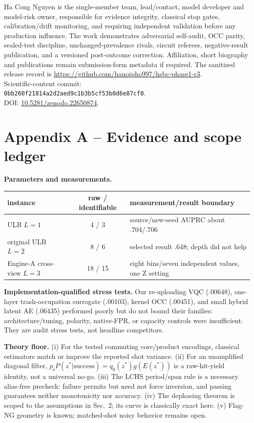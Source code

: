\documentclass[10pt,a4paper]{article}
\newcommand{\psucc}{p_{\mathrm{s}}}
\begin{document}
Ha Cong Nguyen is the single-member team, lead/contact, model developer and
model-risk owner, responsible for evidence integrity, classical stop gates,
calibration/drift monitoring, and requiring independent validation before any
production influence. The work demonstrates adversarial self-audit, OCC
parity, sealed-test discipline, unchanged-prevalence rivals, circuit referees,
negative-result publication, and a versioned post-outcome correction.
Affiliation, short biography and publications remain submission-form metadata
if required. The sanitized release record is
\url{https://github.com/hanoipho997/hsbc-phase1-r3}.\\
Scientific-content commit:\\
\texttt{0bb260f21814a2d2aed9c1b3b5cf53b0d6e87cf0}.\\
DOI: \href{https://doi.org/10.5281/zenodo.22650874}{10.5281/zenodo.22650874}.

\clearpage
\appendix
\section*{Appendix A -- Evidence and scope ledger}

\textbf{Parameters and measurements.}
\begin{center}\small
\begin{tabularx}{\linewidth}{@{}XcX@{}}
\toprule
instance & raw / identifiable & measurement/result boundary\\
\midrule
ULB $L=1$ & 4 / 3 & source/new-seed AUPRC about .704/.706\\
original ULB $L=2$ & 8 / 6 & selected result .648; depth did not help\\
Engine-A cross-view $L=3$ & 18 / 15 & eight bins/seven independent values, one Z setting\\
\bottomrule
\end{tabularx}
\end{center}

\textbf{Implementation-qualified stress tests.} Our re-uploading VQC (.00648),
one-layer trash-occupation surrogate (.00103), kernel OCC (.00451), and small
hybrid latent AE (.06435) performed poorly but do not bound their families:
architecture/tuning, polarity, native-FPR, or capacity controls were
insufficient. They are audit stress tests, not headline competitors.

\textbf{Theory floor.} (i) For the tested commuting core/product encodings,
classical estimators match or improve the reported shot variance. (ii) For an
unamplified diagonal filter,
$\psucc P(z^*|\mathrm{success})=q_0(z^*)g(E(z^*))$ is a raw-hit-yield identity,
not a universal no-go. (iii) The LCHS period/span rule is a necessary
alias-free precheck: failure permits but need not force inversion, and passing
guarantees neither monotonicity nor accuracy. (iv) The dephasing theorem is
scoped to the assumptions in Sec.~2; its curve is classically exact here.
(v) Flag-NG geometry is known; matched-shot noisy behavior remains open.
\end{document}
